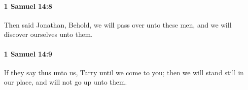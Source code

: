 		\paragraph{1 Samuel 14:8} %
			\label{1SAMUEL-14-8}

			Then said Jonathan, Behold, we will pass over unto these men, and we will discover ourselves unto them.


		\paragraph{1 Samuel 14:9} %
			\label{1SAMUEL-14-9}

			If they say thus unto us, Tarry until we come to you; then we will stand still in our place, and will not go up unto them.


